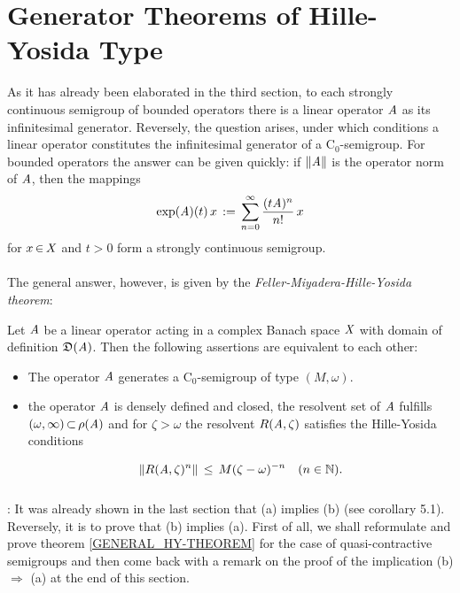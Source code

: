 \documentclass[11pt,twoside]{article}
\begin{document}
\section{Generator Theorems of Hille-Yosida Type}
As it has already been elaborated in the third section,
to each strongly continuous semigroup {\SG} of bounded operators
there is a linear operator $\mathit{A}$ as its infinitesimal generator.
Reversely,
the question arises,
under which conditions a linear operator constitutes
the infinitesimal generator of a C$_0$-semigroup.
For bounded operators the answer can be given quickly:
if $\left\lVert \mathit{A} \right\rVert$ is the operator norm of $\mathit{A}$,
then the mappings
\[
\exp(\mathit{A})(t)\,x \,:=\, \sum_{n=0}^{\infty} \frac{(t \mathit{A})^n}{n!} \,x
\]
for $x {\,\in\,} \mathit{X}$ and $t>0$ form a strongly continuous semigroup.

\paragraph{} %
The general answer,
however,
is given by the \textit{Feller-Miyadera-Hille-Yosida} \textit{theorem}:

\begin{theorem}\label{GENERAL_HY-THEOREM}
Let $\mathit{A}$ be a linear operator acting in a complex Banach space $\mathit{X}$
with domain of definition $\mathfrak{D}(\mathit{A})$.
Then the following assertions are equivalent to each other:

\begin{itemize}[leftmargin=15pt]
\item[(a)]
The operator $\mathit{A}$ generates a C$_0$-semigroup of type $(M,\omega)$.

\item[(b)]
the operator $\mathit{A}$ is densely defined and closed,
the resolvent set of $\mathit{A}$ fulfills $(\omega,\infty) {\,\subset\,} \rho(\mathit{A})$
and for $\zeta > \omega$ the resolvent $R(\mathit{A},\zeta)$
satisfies the Hille-Yosida conditions

\begin{equation}\label{HILLE-YOSIDA_CONDITIONS}
\left\lVert R(\mathit{A},\zeta)^n \right\rVert
\, \leq \, M (\zeta - \omega)^{-n} \quad (n \in {\mathbb{N}}).
\end{equation}
\end{itemize}
\end{theorem}

\subparagraph{}
\Proof:
It was already shown in the last section that (a) implies (b)
(see corollary 5.1).
Reversely,
it is to prove that (b) implies (a).
First of all,
we shall reformulate and prove theorem \ref{GENERAL_HY-THEOREM}
for the case of quasi-contractive semigroups
and then come back with a remark on the proof of the implication
(b) $\Rightarrow$ (a) at the end of this section.
\end{document}
